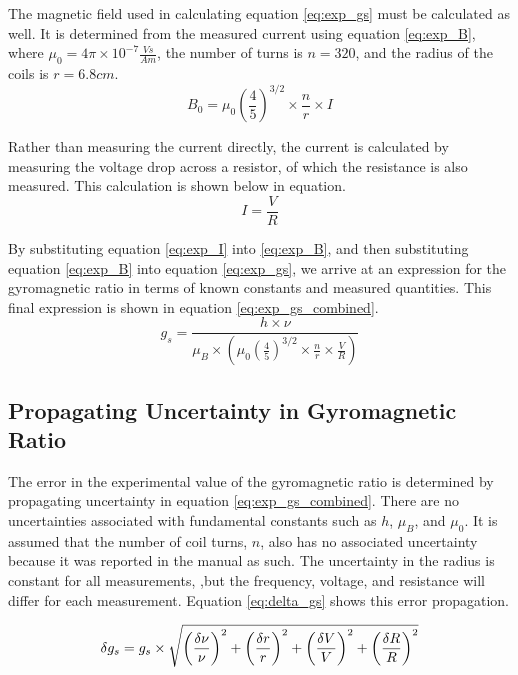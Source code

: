 \documentclass[a4paper]{article}
\begin{document}
\qq The magnetic field used in calculating equation \ref{eq:exp_gs} must be calculated as well. It is determined from the measured current using equation \ref{eq:exp_B}, where $\mu_0 = 4 \pi \times 10^{-7} \frac{Vs}{Am}$, the number of turns is $n=320$, and the radius of the coils is $r=6.8cm$.
\begin{equation}
\label{eq:exp_B}
B_0 = \mu_0 \left( \frac{4}{5} \right) ^{3/2} \times \frac{n}{r} \times I
\end{equation}

\qq Rather than measuring the current directly, the current is calculated by measuring the voltage drop across a resistor, of which the resistance is also measured. This calculation is shown below in equation.
\begin{equation}
\label{eq:exp_I}
I = \frac{V}{R}
\end{equation}

\qq By substituting equation \ref{eq:exp_I} into \ref{eq:exp_B}, and then substituting equation \ref{eq:exp_B} into equation \ref{eq:exp_gs}, we arrive at an expression for the gyromagnetic ratio in terms of known constants and measured quantities. This final expression is shown in equation \ref{eq:exp_gs_combined}.
\begin{equation}
\label{eq:exp_gs_combined}
g_s = \frac{h \times \nu}{\mu_B \times \left( \mu_0 \left( \frac{4}{5} \right) ^{3/2} \times \frac{n}{r} \times \frac{V}{R} \right) }
\end{equation}

\subsection{Propagating Uncertainty in Gyromagnetic Ratio}
\qq The error in the experimental value of the gyromagnetic ratio is determined by propagating uncertainty in equation \ref{eq:exp_gs_combined}. There are no uncertainties associated with fundamental constants such as $h$, $\mu_B$, and $\mu_0$. It is assumed that the number of coil turns, $n$, also has no associated uncertainty because it was reported in the manual as such. The uncertainty in the radius is constant for all measurements, ,but the frequency, voltage, and resistance will differ for each measurement. Equation \ref{eq:delta_gs} shows this error propagation.

\begin{equation}
\label{eq:delta_gs}
\delta g_s = g_s \times 
              \sqrt {
              		  \left( \frac{\delta \nu}{\nu} \right) ^2
              		+ \left( \frac{\delta r}{r} \right) ^2
              		+ \left( \frac{\delta V}{V} \right) ^2
              		+ \left( \frac{\delta R}{R} \right) ^2
					} \\
\end{equation}
\end{document}
